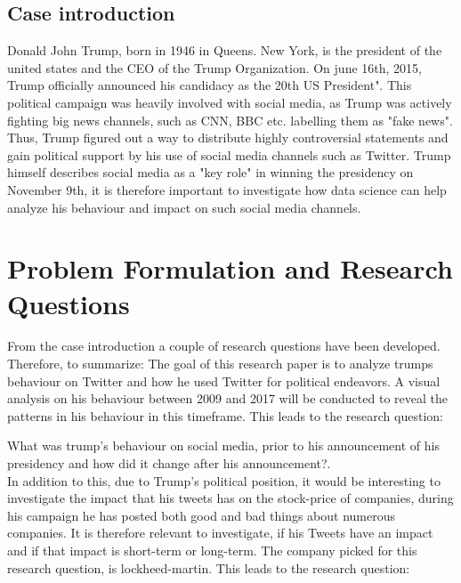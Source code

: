 \documentclass[12pt]{article}
\begin{document}
\subsection{Case introduction}
Donald John Trump, born in 1946 in Queens. New York, is the president of the united states and the CEO of the Trump Organization. On june 16th, 2015, Trump officially announced his candidacy as the 20th US President". This political campaign was heavily involved with social media, as Trump was actively fighting big news channels, such as CNN, BBC etc. labelling them as "fake news". Thus, Trump figured out a way to distribute highly controversial statements and gain political support by his use of social media channels such as Twitter. Trump himself describes social media as a "key role" in winning the presidency on November 9th, it is therefore important to investigate how data science can help analyze his behaviour and impact on such social media channels.





\section{Problem Formulation and Research Questions} \label{sec:ch1}
From the case introduction a couple of research questions have been developed. Therefore, to summarize:  The goal of this research paper is to analyze  trumps behaviour on Twitter and how he used Twitter for political endeavors. A visual analysis on his behaviour between 2009 and 2017 will be conducted to reveal the patterns in his behaviour in this timeframe. This leads to the research question: 

\par\vspace{10pt}

What was trump's behaviour on social media, prior to his announcement of his presidency and how did it change after his announcement?.\\

In addition to this, due to Trump's political position, it would be interesting to investigate the impact that his tweets has on the stock-price of companies, during his campaign he has posted both good and bad things about numerous companies. It is therefore relevant to investigate, if his Tweets have an impact and if that impact is short-term or long-term. The company picked for this research question, is lockheed-martin. This leads to the research question:\\
\end{document}

